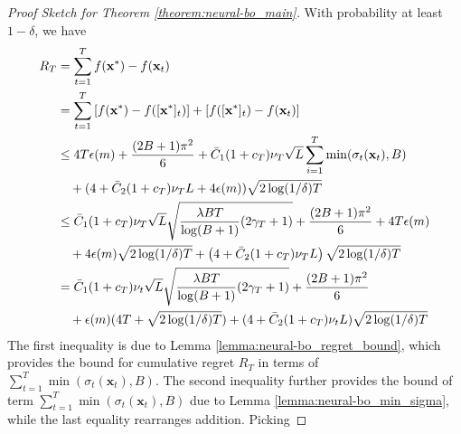 


\begin{proof} [Proof Sketch for Theorem \ref{theorem:neural-bo_main}]
With probability at least $1-\delta$, we have
\begin{align*}
 R_T &  = \sum^T_{t=1} f(\mathbf{x^*}) - f(\mathbf{x}_t) \\ 
     & = \sum^T_{t=1} \left[f(\mathbf{x}^*) - f([\mathbf{x}^*]_t)\right] + \left[f([\mathbf{x}^*]_t) - f(\mathbf{x}_t) \right] \\ 
     &\leq 4T \epsilon(m) + \frac{(2B+1)\pi^2}{6} + \Bar{C}_1(1+c_T)\nu_T \sqrt{L} \sum^T_{i=1} \min(\sigma_t(\mathbf{x}_t), B) \\
     & \quad +(4+\Bar{C}_2(1+c_T)\nu_T L + 4\epsilon(m))\sqrt{2 \log(1/\delta)T} \\
     & \leq \Bar{C}_1 (1+c_T)\nu_T \sqrt{L} \sqrt{\frac{\lambda BT}{\log(B+1)} (2\gamma_T+1)} 
     + \frac{(2B+1)\pi^2}{6} + 4T \epsilon(m) \\
     & \quad + 4\epsilon(m)\sqrt{2 \log(1/\delta)T}  +  \left(4+\Bar{C}_2(1+c_T)\nu_T L\right)\sqrt{2 \log(1/\delta)T}  \\
     &  = \Bar{C}_1(1+c_T)\nu_t \sqrt{L} \sqrt{\frac{\lambda BT}{\log(B+1)} (2\gamma_T+1)} + \frac{(2B+1)\pi^2}{6} \\
     & \quad +  \epsilon(m)(4T+ \sqrt{2 \log(1/\delta)T}) + (4+\Bar{C}_2(1+c_T)\nu_t L)\sqrt{2 \log(1/\delta)T} \\
     \end{align*} 
The first inequality is due to Lemma \ref{lemma:neural-bo_regret_bound}, which provides the bound for cumulative regret $R_T$ in terms of $\sum^T_{t=1} \min(\sigma_t(\mathbf{x}_t),B)$.  The second inequality further provides the bound of term $\sum^T_{t=1} \min(\sigma_t(\mathbf{x}_t),B)$ due to Lemma \ref{lemma:neural-bo_min_sigma}, while the last equality rearranges addition.  Picking

\end{proof}
